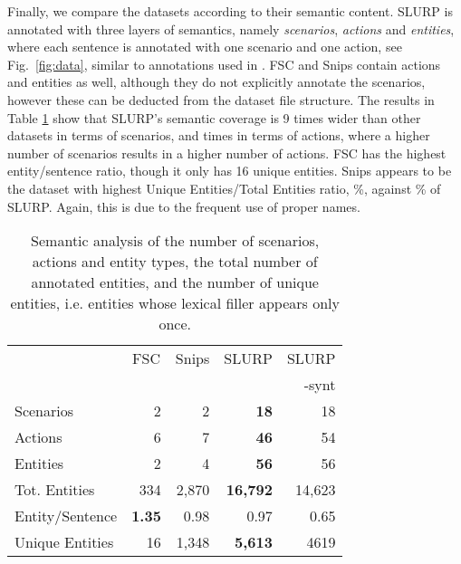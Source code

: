 \documentclass[11pt,a4paper]{article}
\newcommand{\datasetacr}{SLURP}
\begin{document}
 Finally, we compare the datasets according to their semantic content. \datasetacr{} is annotated with three layers of semantics, namely \textit{scenarios}, \textit{actions}  and \textit{entities}, 
where each sentence is annotated with one scenario and one action,  see Fig.\ \ref{fig:data}, similar to annotations used in \cite{budzianowski2018:woz, Schuster19:facebook}. FSC and Snips contain actions and entities as well, although they do not explicitly annotate the scenarios, however these can be deducted from the dataset file structure. The results in Table \ref{tab:semantics} show that \datasetacr's semantic coverage is 9 times wider than other datasets in terms of scenarios, and  times in terms of actions, where  a higher number of scenarios results in a higher number of actions. FSC has the highest entity/sentence ratio, though it only has 16 unique entities. Snips appears to be the dataset with highest Unique Entities/Total Entities ratio, \%, against \% of \datasetacr. Again, this is due to the frequent use of proper names. 

\begin{table}[]
    \centering
    \footnotesize
\begin{tabular}{lrrrr}
\hline
            & \multicolumn{1}{c}{FSC}   & \multicolumn{1}{c}{Snips}   &   \multicolumn{1}{c}{\datasetacr} &   \multicolumn{1}{c}{\datasetacr}\\
            & & & & -synt\\
\hline
 Scenarios  & 2       & 2     &      \textbf{18} &     18       \\
 Actions    & 6       & 7      &      \textbf{46} &     54       \\
 Entities     & 2        & 4       &      \textbf{56} &  56          \\
 Tot. Entities        & 334      & 2,870    &   \textbf{16,792} &     14,623    \\
 Entity/Sentence & \textbf{1.35} & 0.98  & 0.97 &  0.65 \\
 Unique Entities & 16       & 1,348    &    \textbf{5,613} &    4619      \\
\hline
\end{tabular}
    \caption{Semantic analysis of the number of scenarios, actions and entity types, the total number of annotated entities, and the number of unique entities, i.e. entities whose lexical filler appears only once.}
    \label{tab:semantics}
\end{table}
\end{document}
